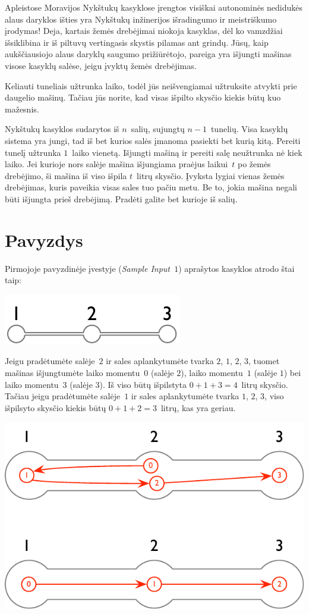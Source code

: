 
\noindent
Apleistose Moravijos Nykštukų kasyklose įrengtos visiškai autonominės nedidukės alaus daryklos
išties yra Nykštukų inžinerijos išradingumo ir meistriškumo įrodymas!
Deja, kartais žemės drebėjimai niokoja kasyklas, dėl ko vamzdžiai išsiklibina ir iš piltuvų vertingasis skystis pilamas ant grindų.
Jūsų, kaip aukščiausiojo alaus daryklų saugumo prižiūrėtojo, pareiga yra išjungti mašinas visose kasyklų salėse, 
jeigu įvyktų žemės drebėjimas.

Keliauti tuneliais užtrunka laiko, todėl jūs neišvengiamai užtruksite atvykti prie daugelio mašinų.
Tačiau jūs norite, kad visas išpilto skysčio kiekis būtų kuo mažesnis.

\medskip
Nykštukų kasyklos sudarytos iš $n$~salių, sujungtų $n-1$~tunelių.
Visa kasyklų sistema yra jungi, tad iš bet kurios salės įmanoma pasiekti bet kurią kitą.
Pereiti tunelį užtrunka $1$~laiko vienetą.
Išjungti mašiną ir pereiti salę neužtrunka nė kiek laiko.
Jei kurioje nors salėje mašina išjungiama praėjus laikui~$t$ po žemės drebėjimo, ši mašina iš viso išpila
$t$~litrų skysčio.
Įvyksta lygiai vienas žemės drebėjimas, kuris paveikia visas sales tuo pačiu metu. 
Be to, jokia mašina negali būti išjungta prieš drebėjimą. 
Pradėti galite bet kurioje iš salių.

\section*{Pavyzdys}

Pirmojoje pavyzdinėje įvestyje (\emph{Sample Input~$1$}) aprašytos kasyklos atrodo štai taip:

\includegraphics[width=.2\textwidth]{img/sample-1.pdf}

Jeigu pradėtumėte salėje~$2$ ir sales aplankytumėte tvarka $2$, $1$, $2$, $3$, 
tuomet mašinas išjungtumėte laiko momentu~$0$ (salėje $2$), laiko momentu~$1$ (salėje $1$) bei laiko momentu~$3$ (salėje $3$).
Iš viso būtų išpilstyta $0+1+3=4$~litrų skysčio.
Tačiau jeigu pradėtumėte salėje~$1$ ir sales aplankytumėte tvarka $1$, $2$, $3$, 
viso išpilsyto skysčio kiekis būtų $0+1+2=3$~litrų, kas yra geriau.

\includegraphics[width=.4\textwidth]{img/sample-1-ans.pdf}

